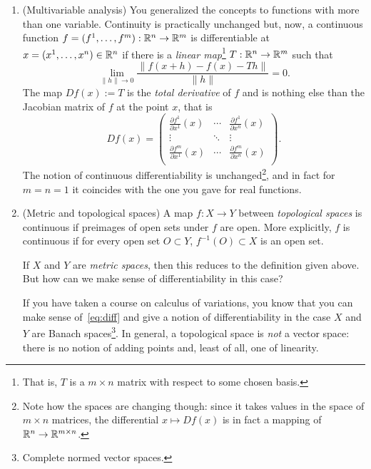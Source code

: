 \begin{enumerate}
	\item (Multivariable analysis) You generalized the concepts to functions with more than one variable.
	      Continuity is practically unchanged but, now, a continuous function $f=(f^1, \ldots, f^m):\mathbb{R}^n\to\mathbb{R}^m$ is differentiable at $x=(x^1,\ldots,x^n)\in\mathbb{R}^n$ if there is a \emph{linear map}\footnote{That is, $T$ is a $m\times n$ matrix with respect to some chosen basis.} $T: \mathbb{R}^n\to\mathbb{R}^m$ such that
	      \begin{equation}\label{eq:diff}
		      \lim_{\|h\|\to 0} \frac{\|f(x+h) - f(x) - T h\|}{\|h\|} = 0.
	      \end{equation}
	      The map $Df(x) := T$ is the \emph{total derivative} of $f$ and is nothing else than the Jacobian matrix of $f$ at the point $x$, that is
	      \begin{equation}\label{eq:jacobian}
		      Df(x) = \begin{pmatrix}
			      \frac{\partial f^1}{\partial x^1}(x) & \cdots & \frac{\partial f^1}{\partial x^n}(x) \\
			      \vdots                               & \ddots & \vdots                               \\
			      \frac{\partial f^m}{\partial x^1}(x) & \cdots & \frac{\partial f^m}{\partial x^n}(x) \\
		      \end{pmatrix}.
	      \end{equation}
	      The notion of continuous differentiability is unchanged\footnote{Note how the spaces are changing though: since it takes values in the space of $m\times n$ matrices, the differential $x\mapsto Df(x)$ is in fact a mapping of $\mathbb{R}^n \to \mathbb{R}^{m\times n}$.}, and in fact for $m=n=1$ it coincides with the one you gave for real functions.

	\item (Metric and topological spaces) A map $f:X\to Y$ between \emph{topological spaces} is continuous if preimages of open sets under $f$ are open. More explicitly, $f$ is continuous if for every open set $O\subset Y$, $f^{-1}(O)\subset X$ is an open set.

	      If $X$ and $Y$ are \emph{metric spaces}, then this reduces to the definition given above.
	      But how can we make sense of differentiability in this case?

	      If you have taken a course on calculus of variations, you know that you can make sense of~\eqref{eq:diff} and give a notion of differentiability in the case $X$ and $Y$ are Banach spaces\footnote{Complete normed vector spaces.}.
	      In general, a topological space is \emph{not} a vector space: there is no notion of adding points and, least of all, one of linearity.
\end{enumerate}

